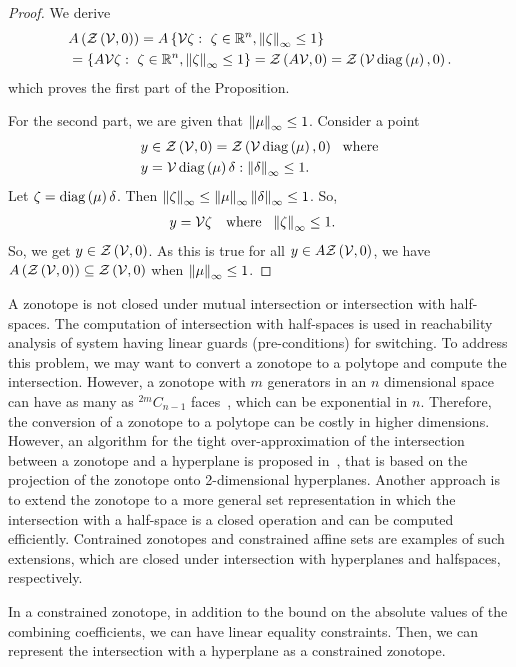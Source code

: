 \begin{proof}
We derive
\begin{align*}
& A\left(\mathit{\mathcal{Z}}\left(\mathcal{V},0\right)\right) =
A\left\{\mathcal{V}\zeta:~\zeta\in\mathbb{R}^n,\left\|\zeta\right\|_{\infty}\leq 1\right\}\\
& =\left\{A\mathcal{V}\zeta:~\zeta\in\mathbb{R}^n,\left\|\zeta\right\|_{\infty}\leq 1\right\}
= \mathit{\mathcal{Z}}\left(A\mathcal{V},0\right)=\mathit{\mathcal{Z}}\left(\mathcal{V}\operatorname{diag}\left(\mu\right),0\right).
\end{align*}
%
which proves the first part of the
Proposition.

For the second part, we are given that $\left\|\mu\right\|_{\infty}\leq 1$.
Consider a point
%
\begin{align*}
  & y\in \mathit{\mathcal{Z}}\left(\mathcal{V},0\right)=\mathit{\mathcal{Z}}\left(\mathcal{V}\operatorname{diag}\left(\mu\right),0\right)~~\text{where}\\
  &y = \mathcal{V}\operatorname{diag}\left(\mu\right)\delta:\left\|\delta\right\|_{\infty}\leq
1.
\end{align*}
%
Let $\zeta = \operatorname{diag}\left(\mu\right)\delta$. Then $\left\|\zeta\right\|_{\infty} \leq
\left\|\mu\right\|_{\infty}\left\|\delta\right\|_{\infty} \leq 1$.  So,
%
\begin{align*}
  & y=\mathcal{V}\zeta~~\text{ where }~
  \left\|\zeta\right\|_{\infty}\leq 1.
\end{align*}
%
So, we get $y\in \mathit{\mathcal{Z}}\left(\mathcal{V},0\right)$.  As this is true for all $y\in
A\mathit{\mathcal{Z}}\left(\mathcal{V},0\right)$, we have
$A\left(\mathit{\mathcal{Z}}\left(\mathcal{V},0\right)\right)\subseteq
\mathit{\mathcal{Z}}\left(\mathcal{V},0\right)$ when $\left\|\mu\right\|_{\infty}\leq 1$.
\end{proof}
%
A zonotope is not closed under mutual intersection or intersection
with half-spaces.  The computation of intersection with half-spaces is
used in reachability analysis of system having linear guards
(pre-conditions) for switching.  To address this problem, we may want
to convert a zonotope to a polytope and compute the intersection.
However, a zonotope with $m$ generators in an $n$ dimensional space
can have as many as $^{2m}C_{n-1}$ faces~\cite{todo}, which can be
exponential in $n$.  Therefore, the conversion of a zonotope to a
polytope can be costly in higher dimensions.  However, an algorithm
for the tight over-approximation of the intersection between a
zonotope and a hyperplane is proposed in~\cite{todo}, that is based on
the projection of the zonotope onto 2-dimensional hyperplanes.
Another approach is to extend the zonotope to a more general set
representation in which the intersection with a half-space is a closed
operation and can be computed efficiently.  Contrained zonotopes and
constrained affine sets are examples of such extensions, which are
closed under intersection with hyperplanes and halfspaces,
respectively.

In a constrained zonotope, in addition to the bound on the absolute
values of the combining coefficients, we can have linear equality
constraints.  Then, we can represent the intersection with a
hyperplane as a constrained zonotope.
%
\begin{definition}

\end{definition}
%
